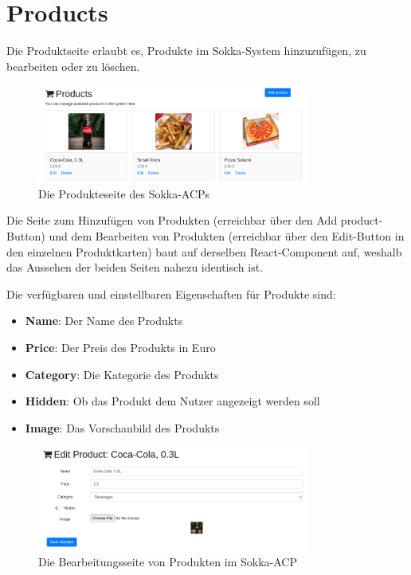 \section{Products}

Die Produktseite erlaubt es, Produkte im Sokka-System hinzuzufügen, zu bearbeiten oder zu löschen.

\begin{figure}[ht]
    \centering
    \includegraphics[width=0.8\textwidth]{images/ACP/products.png}
    \caption{Die Produkteseite des Sokka-ACPs}
\end{figure}

Die Seite zum Hinzufügen von Produkten (erreichbar über den \glqq Add product\grqq -Button) und dem Bearbeiten von Produkten (erreichbar über den \glqq Edit\grqq -Button in den einzelnen Produktkarten) baut auf derselben React-Component auf, weshalb das Aussehen der beiden Seiten nahezu identisch ist.

Die verfügbaren und einstellbaren Eigenschaften für Produkte sind:

\begin{itemize}
    \item \textbf{Name}: Der Name des Produkts
    \item \textbf{Price}: Der Preis des Produkts in Euro
    \item \textbf{Category}: Die Kategorie des Produkts
    \item \textbf{Hidden}: Ob das Produkt dem Nutzer angezeigt werden soll
    \item \textbf{Image}: Das Vorschaubild des Produkts
\end{itemize}

\begin{figure}[ht]
    \centering
    \includegraphics[width=0.8\textwidth]{images/ACP/products_edit.png}
    \caption{Die Bearbeitungsseite von Produkten im Sokka-ACP}
\end{figure}